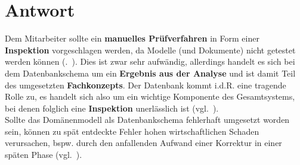 
\section*{Antwort}

Dem Mitarbeiter sollte ein \textbf{manuelles Prüfverfahren} in Form einer \textbf{Inspektion} vorgeschlagen werden, da Modelle (und Dokumente) nicht getestet werden können (\vgl.~\cite[10]{Wed09c}). Dies ist zwar sehr aufwändig, allerdings handelt es sich bei dem Datenbankschema um ein \textbf{Ergebnis aus der Analyse} und ist damit  Teil des umgesetzten \textbf{Fachkonzepts}. Der Datenbank kommt i.d.R. eine tragende Rolle zu, es handelt sich also um ein wichtige Komponente des Gesamtsystems, bei denen folglich eine \textbf{Inspektion} unerlässlich ist (vgl.~\cite[16]{Wed09c}).\\
Sollte das Domänenmodell als Datenbankschema fehlerhaft umgesetzt worden sein, können zu spät entdeckte Fehler hohen wirtschaftlichen Schaden verursachen, bspw. durch den anfallenden Aufwand einer Korrektur in einer späten Phase (vgl.~\cite[484 ff.]{Bal08}).